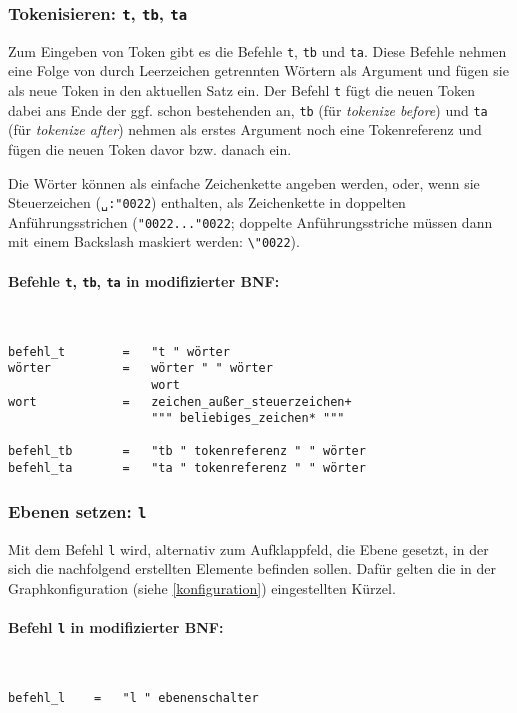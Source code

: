 \documentclass[12pt]{scrartcl}
\newcommand{\quo}{\char"0022}
\begin{document}
\subsubsection{Tokenisieren: \texttt{t}, \texttt{tb}, \texttt{ta}}

Zum Eingeben von Token gibt es die Befehle \texttt{t}, \texttt{tb} und \texttt{ta}. Diese Befehle nehmen eine Folge von durch Leerzeichen getrennten Wörtern als Argument und fügen sie als neue Token in den aktuellen Satz ein. Der Befehl \texttt{t} fügt die neuen Token dabei ans Ende der ggf. schon bestehenden an, \texttt{tb} (für \textit{tokenize before}) und \texttt{ta} (für \textit{tokenize after}) nehmen als erstes Argument noch eine Tokenreferenz und fügen die neuen Token davor bzw. danach ein.

Die Wörter können als einfache Zeichenkette angeben werden, oder, wenn sie Steuerzeichen (\texttt{␣:\quo}) enthalten, als Zeichenkette in doppelten Anführungsstrichen (\texttt{\quo...\quo}; doppelte Anführungsstriche müssen dann mit einem Backslash maskiert werden: \texttt{\textbackslash\quo}).

\paragraph*{Befehle \texttt{t}, \texttt{tb}, \texttt{ta} in modifizierter BNF:}
~
\begin{framed}
\begin{lstlisting}
befehl_t        =   "t " wörter
wörter          =   wörter " " wörter
                    wort
wort            =   zeichen_außer_steuerzeichen+
                    """ beliebiges_zeichen* """

befehl_tb       =   "tb " tokenreferenz " " wörter
befehl_ta       =   "ta " tokenreferenz " " wörter
\end{lstlisting}
\end{framed}


\subsubsection{Ebenen setzen: \texttt{l}}\label{l}

Mit dem Befehl \texttt{l} wird, alternativ zum Aufklappfeld, die Ebene gesetzt, in der sich die nachfolgend erstellten Elemente befinden sollen. Dafür gelten die in der Graphkonfiguration (siehe \ref{konfiguration}) eingestellten Kürzel.

\paragraph*{Befehl \texttt{l} in modifizierter BNF:}
~
\begin{framed}
\begin{lstlisting}
befehl_l    =   "l " ebenenschalter
\end{lstlisting}
\end{framed}
\end{document}
